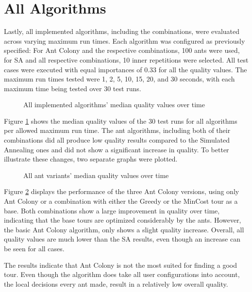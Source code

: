 \section{All Algorithms}

Lastly, all implemented algorithms, including the combinations, were evaluated across varying maximum run times. 
Each algorithm was configured as previously specified: 
For Ant Colony and the respective combinations, 100 ants were used, for SA and all respective combinations, 10 inner repetitions were selected.
All test cases were executed with equal importances of 0.33 for all the quality values.
The maximum run times tested were 1, 2, 5, 10, 15, 20, and 30 seconds, with each maximum time being tested over 30 test runs.

\begin{figure}
	\centering
	
	\caption{All implemented algorithms' median quality values over time}
	\label{fig:AllOverTime}
\end{figure}


Figure \ref{fig:AllOverTime} shows the median quality values of the 30 test runs for all algorithms per allowed maximum run time.
The ant algorithms, including both of their combinations did all produce low quality results compared to the Simulated Annealing ones and did not show a significant increase in quality. 
To better illustrate these changes, two separate graphs were plotted. 


\begin{figure}
	\centering
	
	\caption{All ant variants' median quality values over time}
	\label{fig:AllOverTimeAnt}
\end{figure}


Figure \ref{fig:AllOverTimeAnt} displays the performance of the three Ant Colony versions, using only Ant Colony or a combination with either the Greedy or the MinCost tour as a base.
Both combinations show a large improvement in quality over time, indicating that the base tours are optimized considerably by the ants.
However, the basic Ant Colony algorithm, only shows a slight quality increase.
Overall, all quality values are much lower than the SA results, even though an increase can be seen for all cases.

The results indicate that Ant Colony is not the most suited for finding a good tour.
Even though the algorithm does take all user configurations into account, the local decisions every ant made, result in a relatively low overall quality.




